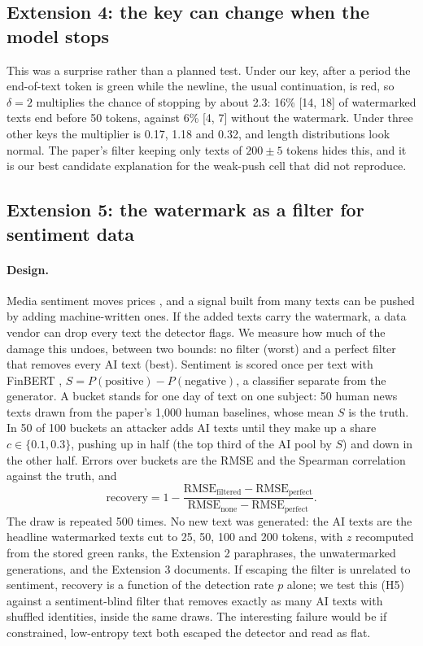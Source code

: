 \documentclass[12pt,letterpaper]{article}
\begin{document}
\subsection{Extension 4: the key can change when the model stops}

This was a surprise rather than a planned test. Under our key, after a period the end-of-text token is green while the newline, the usual continuation, is red, so $\delta = 2$ multiplies the chance of stopping by about 2.3: 16\% [14, 18] of watermarked texts end before 50 tokens, against 6\% [4, 7] without the watermark. Under three other keys the multiplier is 0.17, 1.18 and 0.32, and length distributions look normal. The paper's filter keeping only texts of $200 \pm 5$ tokens hides this, and it is our best candidate explanation for the weak-push cell that did not reproduce.

\subsection{Extension 5: the watermark as a filter for sentiment data}

\paragraph{Design.} Media sentiment moves prices \citep{tetlock2007}, and a signal built from many texts can be pushed by adding machine-written ones. If the added texts carry the watermark, a data vendor can drop every text the detector flags. We measure how much of the damage this undoes, between two bounds: no filter (worst) and a perfect filter that removes every AI text (best). Sentiment is scored once per text with FinBERT \citep{araci2019finbert}, $S = P(\text{positive}) - P(\text{negative})$, a classifier separate from the generator. A bucket stands for one day of text on one subject: 50 human news texts drawn from the paper's 1,000 human baselines, whose mean $S$ is the truth. In 50 of 100 buckets an attacker adds AI texts until they make up a share $c \in \{0.1, 0.3\}$, pushing up in half (the top third of the AI pool by $S$) and down in the other half. Errors over buckets are the RMSE and the Spearman correlation against the truth, and
\begin{equation}
\text{recovery} = 1 - \frac{\text{RMSE}_{\text{filtered}} - \text{RMSE}_{\text{perfect}}}{\text{RMSE}_{\text{none}} - \text{RMSE}_{\text{perfect}}} .
\end{equation}
The draw is repeated 500 times. No new text was generated: the AI texts are the headline watermarked texts cut to 25, 50, 100 and 200 tokens, with $z$ recomputed from the stored green ranks, the Extension 2 paraphrases, the unwatermarked generations, and the Extension 3 documents. If escaping the filter is unrelated to sentiment, recovery is a function of the detection rate $p$ alone; we test this (H5) against a sentiment-blind filter that removes exactly as many AI texts with shuffled identities, inside the same draws. The interesting failure would be if constrained, low-entropy text both escaped the detector and read as flat.
\end{document}
